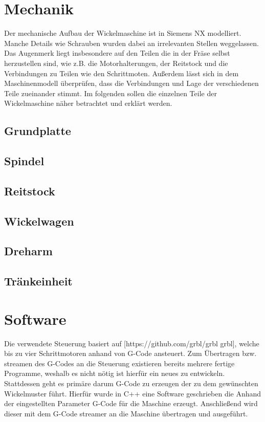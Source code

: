 \documentclass[12pt, a4paper, ngerman]{article}
\begin{document}
\section{Mechanik}
Der mechanische Aufbau der Wickelmaschine ist in Siemens NX modelliert. Manche Details wie Schrauben wurden dabei an irrelevanten Stellen weggelassen. Das Augenmerk liegt insbesondere auf den Teilen die in der Fräse selbst herzustellen sind, wie z.B. die Motorhalterungen, der Reitstock und die Verbindungen zu Teilen wie den Schrittmoten. Außerdem lässt sich in dem Maschinenmodell überprüfen, dass die Verbindungen und Lage der verschiedenen Teile zueinander stimmt. Im folgenden sollen die einzelnen Teile der Wickelmaschine näher betrachtet und erklärt werden.

\subsection{Grundplatte}

\subsection{Spindel}

\subsection{Reitstock}

\subsection{Wickelwagen}

\subsection{Dreharm}

\subsection{Tränkeinheit}



\section{Software}
Die verwendete Steuerung basiert auf [https://github.com/grbl/grbl grbl], welche bis zu vier Schrittmotoren anhand von G-Code ansteuert. Zum Übertragen bzw. streamen des G-Codes an die Steuerung existieren bereits mehrere fertige Programme, weshalb es nicht nötig ist hierfür ein neues zu entwickeln. Stattdessen geht es primäre darum G-Code zu erzeugen der zu dem gewünschten Wickelmuster führt. Hierfür wurde in C++ eine Software geschrieben die Anhand der eingestellten Parameter G-Code für die Maschine erzeugt. Anschließend wird dieser mit dem G-Code streamer an die Maschine übertragen und ausgeführt.
\end{document}
